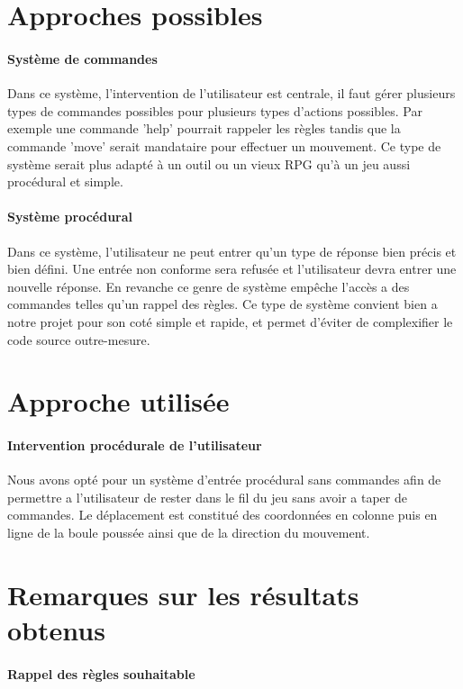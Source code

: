 \documentclass{scrreprt}
\begin{document}
		\section{Approches possibles}
			\paragraph{Système de commandes}
			
			Dans ce système, l'intervention de l'utilisateur est centrale, il faut gérer plusieurs types de commandes possibles pour plusieurs types d'actions possibles. Par exemple une commande 'help' pourrait rappeler les règles tandis que la commande 'move' serait mandataire pour effectuer un mouvement. Ce type de système serait plus adapté à un outil ou un vieux RPG qu'à un jeu aussi procédural et simple.
			
			\paragraph{Système procédural}
			
			Dans ce système, l'utilisateur ne peut entrer qu'un type de réponse bien précis et bien défini. Une entrée non conforme sera refusée et l'utilisateur devra entrer une nouvelle réponse. En revanche ce genre de système empêche l'accès a des commandes telles qu'un rappel des règles. Ce type de système convient bien a notre projet pour son coté simple et rapide, et permet d'éviter de complexifier le code source outre-mesure.
			
		\section{Approche utilisée}
			\paragraph{Intervention procédurale de l'utilisateur}
			
			Nous avons opté pour un système d'entrée procédural sans commandes afin de permettre a l'utilisateur de rester dans le fil du jeu sans avoir a taper de commandes. Le déplacement est constitué des coordonnées en colonne puis en ligne de la boule poussée ainsi que de la direction du mouvement.
			
		\section{Remarques sur les résultats obtenus}
			\paragraph{Rappel des règles souhaitable}
			
\end{document}
